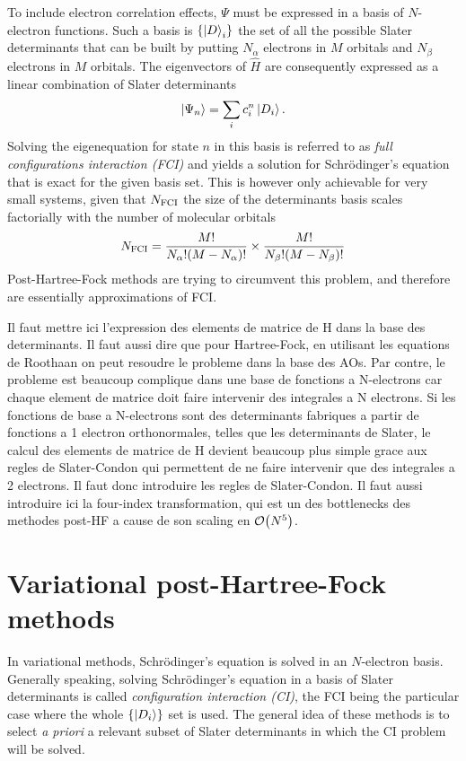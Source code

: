 \documentclass[./thesis.tex]{subfiles}
\begin{document}
To include electron correlation effects, $\Psi$ must be expressed in a basis of $N$-electron functions. Such a basis is $\{\ket D_i \}$ the set of all the possible Slater determinants that can be built by putting $N_\alpha$ electrons in $M$ orbitals and $N_\beta$ electrons in $M$ orbitals.
The eigenvectors of $\widehat{H}$ are consequently expressed as a linear combination of Slater determinants 
\begin{equation}
\ket{\Psi_n} = \sum_{i} c_i^n \ket{D_i}.
\end{equation}
Solving the eigenequation for state $n$ in this basis is referred to as \emph{full configurations interaction (FCI)} and yields a solution for Schrödinger's equation that is exact for the given basis set.
This is however only achievable for very small systems, given that $N_\text{FCI}$ the size of the determinants basis scales factorially with the number of molecular orbitals
\begin{equation}
N_\text{FCI} = \frac{M!}{N_\alpha ! (M-N_\alpha)!} \times \frac{M!}{N_\beta ! (M-N_\beta)!}
\end{equation}
Post-Hartree-Fock methods are trying to circumvent this problem, and therefore are essentially approximations of FCI.

\alert{ Il faut mettre ici l'expression des elements de matrice de H dans la
base des determinants.  Il faut aussi dire que pour Hartree-Fock, en utilisant
les equations de Roothaan on peut resoudre le probleme dans la base des AOs.
Par contre, le probleme est beaucoup complique dans une base de fonctions a
N-electrons car chaque element de matrice doit faire intervenir des integrales
a N electrons.  Si les fonctions de base a N-electrons sont des determinants
fabriques a partir de fonctions a 1 electron orthonormales, telles que les
determinants de Slater, le calcul des elements de matrice de H devient beaucoup
plus simple grace aux regles de Slater-Condon qui permettent de ne faire
intervenir que des integrales a 2 electrons. Il faut donc introduire les regles
de Slater-Condon.  Il faut aussi introduire ici la four-index transformation,
qui est un des bottlenecks des methodes post-HF a cause de son scaling en
$\order{N^5}$.  } 

\section{Variational post-Hartree-Fock methods}

In variational methods, Schrödinger's equation is solved in an $N$-electron basis.
Generally speaking, solving Schrödinger's equation in a basis of Slater determinants is called \emph{configuration interaction (CI)}, the FCI being the particular case where the whole $\{\ket {D_i} \}$ set is used. The general idea of these methods is to select \textit{a priori} a relevant subset of Slater determinants in which the CI problem will be solved.
\end{document}
